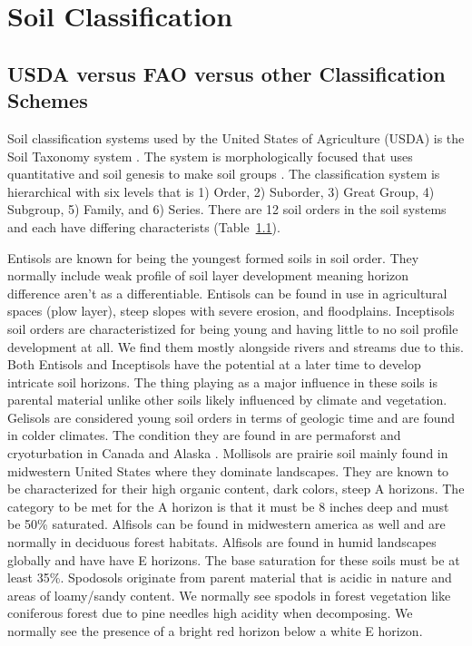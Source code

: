 \section {Soil Classification}

\subsection{USDA versus FAO versus other Classification Schemes}

Soil classification systems used by the United States of Agriculture (USDA) is the  Soil Taxonomy system \citep{soil2003keys}. The system is morphologically focused that uses quantitative and soil genesis to make soil groups \citep{buol1999oxisols}. The classification system is hierarchical with six levels that is 1) Order, 2) Suborder, 3) Great Group, 4) Subgroup, 5) Family, and 6) Series. There are 12 soil orders in the soil systems and each have differing characterists (Table~\ref{}). 

Entisols are known for being the youngest formed soils in soil order. They normally include weak profile of soil layer development meaning horizon difference  aren't as a differentiable. Entisols can be found in use in agricultural spaces (plow layer), steep slopes with severe erosion, and  floodplains.  Inceptisols soil orders are characteristized for being young and having little to no soil profile development at all. We find them mostly alongside rivers and streams due to this.  Both Entisols and Inceptisols have the potential at a later time to develop intricate soil horizons. The thing playing as a major influence in these soils is parental material unlike other soils likely influenced by climate and vegetation. Gelisols are considered young soil orders in terms of geologic time and are found in colder climates. The condition they are found in are permaforst and cryoturbation in Canada and Alaska \citep{soil2003keys}. Mollisols are prairie soil mainly found in midwestern United States where they dominate landscapes. They are known to be characterized for their high organic content, dark colors, steep A horizons. The category to be met for the A horizon is that it must be 8 inches deep and must be 50\% saturated. Alfisols can be found in midwestern america as well and are normally in deciduous forest habitats. Alfisols are found in humid landscapes globally and have have E horizons.  The base saturation for these soils must be at least 35\%. Spodosols originate from parent material that is acidic in nature and areas of loamy/sandy content. We normally see spodols in forest vegetation like coniferous forest due to pine needles high acidity when decomposing. \citep{brady2007colloidal} We normally see the presence of a bright red horizon below a white E horizon.


